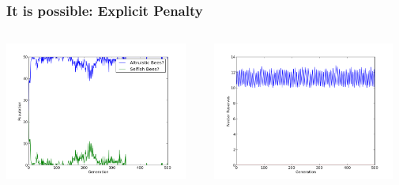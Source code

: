 \documentclass{beamer}
\begin{document}
      \begin{frame}[cr]\frametitle{It is possible: Explicit Penalty}

        \begin{columns}
          \begin{column}{0.48\textwidth}
          \includegraphics[width=6cm]{results/trivial_solution.png}
            
          \end{column}
          \begin{column}{0.48\textwidth}
            
          \includegraphics[width=6cm]{results/trivial_solution_nectar.png}
          \end{column}
        \end{columns}
      \end{frame}
\end{document}
